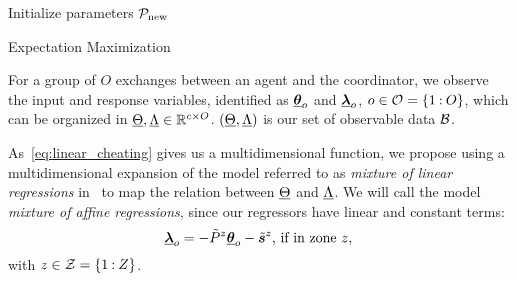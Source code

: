 \documentclass{ifacconf}  %
\begin{document}
\begin{algorithm2e}[h]
  \DontPrintSemicolon%
  Initialize parameters $\mathcal{P}_{\mathrm{new}}$\;
 \caption{Expectation Maximization}\label{alg:em}
\end{algorithm2e}

For a group of $O$ exchanges between an agent and the coordinator, we observe the input and response variables, identified as  ${\underline{\boldsymbol{\theta}}_{o}}$ and ${\underline{\boldsymbol{\lambda}}_{o}}$, ${o\in\mathcal{O}=\{1\mathbin{:}O\}}$, which can be organized in ${\underline{\Theta},\underline{\Lambda}\in\mathbb{R}^{c\times O}}$. ${(\underline{\Theta},\underline{\Lambda})}$ is our set of observable data $\mathcal{B}$.

As~\eqref{eq:linear_cheating} gives us a multidimensional \pwa{} function, we propose using a multidimensional expansion of the model referred to as \emph{mixture of linear regressions} in~\cite{FariaSoromenho2010} to map the relation between $\underline{\Theta}$ and $\underline{\Lambda}$. We will call the model \emph{mixture of affine regressions}, since our regressors have linear and constant terms:
\begin{equation}\label{eq:linear_cheating_random}
  {\underline{\boldsymbol{\lambda}}}_{o}=
    -\tilde{P}^{z}{\underline{\boldsymbol{\theta}}}_{o}-\tilde{\boldsymbol{s}}^{z}\text{, if in zone } z,\\
\end{equation}
with  ${z\in\mathcal{Z}=\{1\mathbin{:}Z\}}$.
\end{document}
